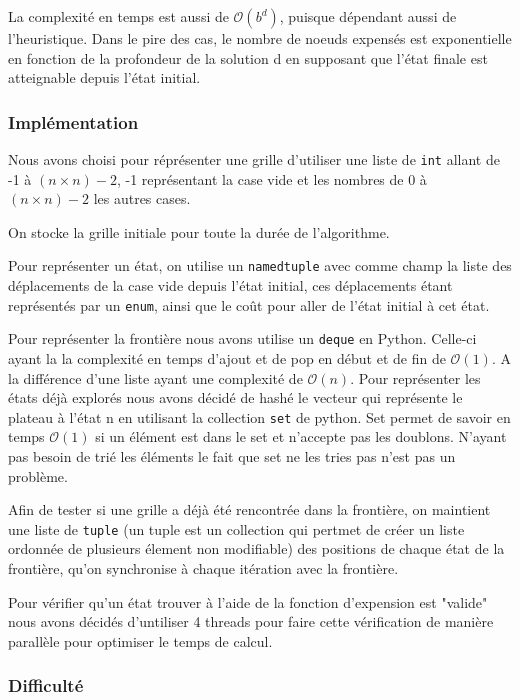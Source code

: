 \documentclass[a4paper, 12pt]{article}
\begin{document}
La complexité en temps est aussi de $\mathcal{O}(b^{d})$, puisque dépendant aussi de l'heuristique. Dans le pire des cas, le nombre de noeuds expensés est exponentielle en fonction de la profondeur de la solution d en supposant que l'état finale est atteignable depuis l'état initial.

\subsubsection{Implémentation}

Nous avons choisi pour réprésenter une grille d'utiliser une liste de \lstinline{int} allant de -1 à $(n \times n) - 2$, -1 représentant la case vide et les nombres de 0 à $(n \times n) - 2$ les autres cases.

On stocke la grille initiale pour toute la durée de l'algorithme.

Pour représenter un état, on utilise un \lstinline{namedtuple} avec comme champ la liste des déplacements de la case vide depuis l'état initial, ces déplacements étant représentés par un \lstinline{enum}, ainsi que le coût pour aller de l'état initial à cet état.

Pour représenter la frontière nous avons utilise un \lstinline{deque} en Python. Celle-ci ayant la la complexité en temps d'ajout et de pop en début et de fin de $\mathcal{O}(1)$. A la différence d'une liste ayant une complexité de $\mathcal{O}(n)$.
    Pour représenter les états déjà explorés nous avons décidé de hashé le vecteur qui représente le plateau à l'état n en utilisant la collection \lstinline{set} de python. Set permet de savoir en temps $\mathcal{O}(1)$ si un élément est dans le set et n'accepte pas les doublons. N'ayant pas besoin de trié les éléments le fait que set ne les tries pas n'est pas un problème.


Afin de tester si une grille a déjà été rencontrée dans la frontière, on maintient une liste de \lstinline{tuple} (un tuple est un collection qui pertmet de créer un liste ordonnée de plusieurs élement non modifiable) des positions de chaque état de la frontière, qu'on synchronise à chaque itération avec la frontière.


Pour vérifier qu'un état trouver à l'aide de la fonction d'expension est "valide" nous avons décidés d'untiliser 4 threads pour faire cette vérification de manière parallèle pour optimiser le temps de calcul.

\subsubsection{Difficulté}
\end{document}

